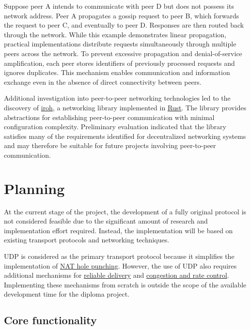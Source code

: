 \documentclass[a4paper, 10pt]{article}
\let\oldsection\section
\renewcommand{\section}{
  \clearpage
  \oldsection
}
\begin{document}
Suppose peer A intends to communicate with peer D but does not possess its network address.
Peer A propagates a gossip request to peer B, which forwards the request to peer C, and eventually to peer D.
Responses are then routed back through the network.
While this example demonstrates linear propagation, practical implementations distribute requests simultaneously
through multiple peers across the network.
To prevent excessive propagation and denial-of-service amplification, each peer stores identifiers of previously processed requests
and ignores duplicates.
This mechanism enables communication and information exchange even in the absence of direct connectivity between peers.

Additional investigation into peer-to-peer networking technologies led to the discovery of
\href{https://www.youtube.com/watch?v=RwAt36Xe3UI}{iroh},
a networking library implemented in \href{https://rust-lang.org/}{Rust}.
The library provides abstractions for establishing peer-to-peer communication with minimal configuration complexity.
Preliminary evaluation indicated that the library satisfies many of the requirements identified for decentralized networking systems
and may therefore be suitable for future projects involving peer-to-peer communication.

\section{Planning} \label{planning}

At the current stage of the project, the development of a fully original protocol is not considered feasible due to the significant amount of research and implementation effort required.
Instead, the implementation will be based on existing transport protocols and networking techniques.

UDP is considered as the primary transport protocol because it simplifies the implementation of
\href{https://en.wikipedia.org/wiki/UDP_hole_punching}{NAT hole punching}.
However, the use of UDP also requires additional mechanisms for
\href{https://www.reddit.com/r/networking/comments/a8c42z/}{reliable delivery}
and
\href{https://en.wikipedia.org/wiki/Network_congestion#Congestion_control}{congestion and rate control}.
Implementing these mechanisms from scratch is outside the scope of the available development time for the diploma project.

\subsection{Core functionality} \label{corefunctionality}
\end{document}
